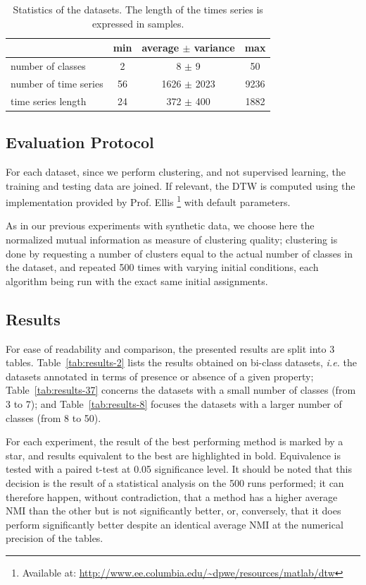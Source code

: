 \documentclass[twoside,11pt]{article}
\begin{document}
\begin{table}
\center
\caption{\label{tab:dbs} Statistics of the datasets. The length of the times series is expressed in samples.}
\begin{tabular}{l|ccc}
& min & average $\pm$ variance & max \\
\hline
number of classes & 2 & 8 $\pm$ 9 & 50 \\
number of time series & 56 & 1626 $\pm$ 2023 & 9236 \\
time series length & 24 & 372 $\pm$ 400 & 1882 \\
\end{tabular}
\end{table}

\subsection{Evaluation Protocol}

For each dataset, since we perform clustering, and not supervised learning, the training and testing data are joined. If relevant, the DTW is computed using the implementation provided by Prof. Ellis \footnote{Available at: \url{http://www.ee.columbia.edu/~dpwe/resources/matlab/dtw}} with default parameters.

As in our previous experiments with synthetic data, we choose here the normalized mutual information as measure of clustering quality; clustering is done by requesting a number of clusters equal to the actual number of classes in the dataset, and repeated 500 times with varying initial conditions, each algorithm being run with the exact same initial assignments.

\subsection{Results}

For ease of readability and comparison, the presented results are split into 3 tables. Table~\ref{tab:results-2} lists the results obtained on bi-class datasets, \textit{i.e.} the datasets annotated in terms of presence or absence of a given property; Table~\ref{tab:results-37} concerns the datasets with a small number of classes (from 3 to 7); and Table~\ref{tab:results-8} focuses the datasets with a larger number of classes (from 8 to 50).

For each experiment, the result of the best performing method is marked by a star, and results equivalent to the best are highlighted in bold. Equivalence is tested with a paired t-test at 0.05 significance level. It should be noted that this decision is the result of a statistical analysis on the 500 runs performed; it can therefore happen, without contradiction, that a method has a higher average NMI than the other but is not significantly better, or, conversely, that it does perform significantly better despite an identical average NMI at the numerical precision of the tables.
\end{document}
